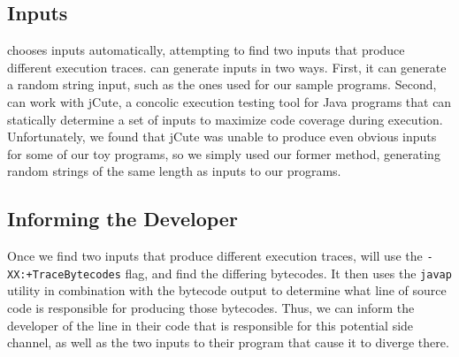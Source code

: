 

\subsection{Inputs}

\jcupid chooses inputs automatically, attempting to find two inputs that produce
different execution traces. \jcupid can generate inputs in two ways. First, it
can generate a random string input, such as the ones used for our sample
programs. Second, \jcupid can work with jCute, a concolic execution testing tool
for Java programs that can statically determine a set of inputs to maximize code
coverage during execution. Unfortunately, we found that jCute was unable to
produce even obvious inputs for some of our toy programs, so we simply used our
former method, generating random strings of the same length as inputs to our
programs.


\subsection{Informing the Developer}

Once we find two inputs that produce different execution traces, \jcupid will
use the \texttt{-XX:+TraceBytecodes} flag, and find the differing bytecodes. It
then uses the \texttt{javap} utility in combination with the bytecode output to
determine what line of source code is responsible for producing those bytecodes.
Thus, we can inform the developer of the line in their code that is responsible
for this potential side channel, as well as the two inputs to their program that
cause it to diverge there.


%

